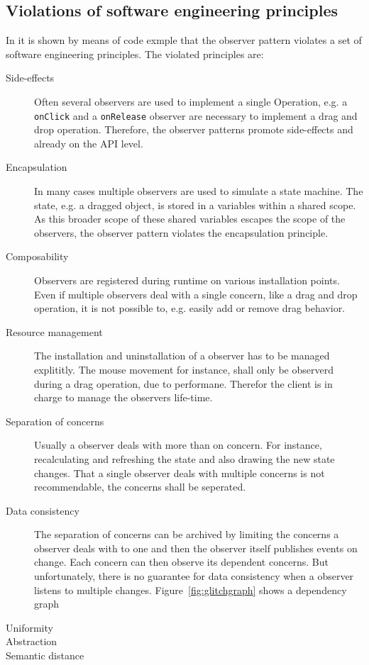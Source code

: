 \documentclass[format=acmtog]{acmart}
\begin{document}
	\subsection{Violations of software engineering principles}
		In \cite{Maier:2012} it is shown by means of code exmple that the observer pattern violates a set of software engineering principles.
		The violated principles are:
		\begin{description}
			\item[Side-effects]
			Often several observers are used to implement a single Operation,
			e.g. a \lstinline|onClick| and a \lstinline|onRelease| observer are necessary to implement a drag and drop operation.
			Therefore, the observer patterns promote side-effects and already on the API level.
			
			\item[Encapsulation]
			In many cases multiple observers are used to simulate a state machine. 
			The state, e.g. a dragged object, is stored in a variables within a shared scope.
			As this broader scope of these shared variables escapes the scope of the observers, the observer pattern violates the encapsulation principle.
			
			\item[Composability]
			Observers are registered during runtime on various installation points.
			Even if multiple observers deal with a single concern, like a drag and drop operation, it is not possible to, e.g. easily add or remove drag behavior.
			
			\item[Resource management]
			The installation and uninstallation of a observer has to be managed explititly.
			The mouse movement for instance, shall only be observerd during a drag operation, due to performane. 
			Therefor the client is in charge to manage the observers life-time.
			
			\item[Separation of concerns]
			Usually a observer deals with more than on concern. For instance, recalculating and refreshing the state and also drawing the new state changes.
			That a single observer deals with multiple concerns is not recommendable, the concerns shall be seperated.

			\item[Data consistency]
			The separation of concerns can be archived by limiting the concerns a observer deals with to one and then the observer itself publishes events on change.
			Each concern can then observe its dependent concerns.
			But unfortunately, there is no guarantee for data consistency when a observer listens to multiple changes. 
			Figure~\ref{fig:glitchgraph} shows a dependency graph 
			
			
			\item[Uniformity]
			
			\item[Abstraction]
			
			\item[Semantic distance]
		\end{description}
\end{document}
